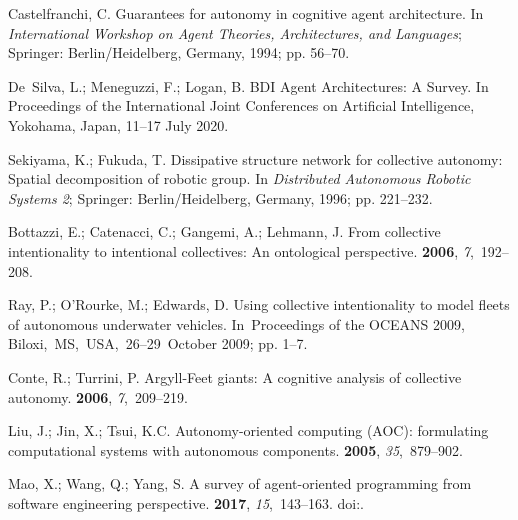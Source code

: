 \documentclass[jsan,article,accept,moreauthors,pdftex]{Definitions/mdpi}
\begin{document}
\begin{thebibliography}{999}
Castelfranchi, C.
\newblock Guarantees for autonomy in cognitive agent architecture.
\newblock   In \emph{International Workshop on Agent Theories, Architectures, and Languages}; Springer: Berlin/Heidelberg, Germany,  1994; pp. 56--70.

De~Silva, L.; Meneguzzi, F.; Logan, B.
\newblock BDI Agent Architectures: A Survey.
\newblock  In Proceedings of the International Joint Conferences on Artificial Intelligence, Yokohama, Japan, 11--17 July 2020.

Sekiyama, K.; Fukuda, T.
\newblock Dissipative structure network for collective autonomy: Spatial
  decomposition of robotic group. In {\em Distributed Autonomous Robotic
  Systems 2}; Springer: Berlin/Heidelberg, Germany, 1996; pp. 221--232.

Bottazzi, E.; Catenacci, C.; Gangemi, A.; Lehmann, J.
\newblock From collective intentionality to intentional collectives: An
  ontological perspective.
 {\bf 2006}, {\em 7},~192--208.

Ray, P.; O'Rourke, M.; Edwards, D.
\newblock Using collective intentionality to model fleets of autonomous
  underwater vehicles.
\newblock  In~Proceedings of the OCEANS 2009, \mbox{Biloxi, MS, USA, 26--29 October} 2009; pp. 1--7.

Conte, R.; Turrini, P.
\newblock Argyll-Feet giants: {A} cognitive analysis of collective autonomy.
 {\bf 2006}, {\em 7},~209--219.

Liu, J.; Jin, X.; Tsui, K.C.
\newblock Autonomy-oriented computing {(AOC):} formulating computational
  systems with autonomous components.
 {\bf 2005}, {\em
  35},~879--902.

Mao, X.; Wang, Q.; Yang, S.
\newblock A survey of agent-oriented programming from software engineering
  perspective.
 {\bf 2017}, {\em 15},~143--163.
\newblock
  doi:{\href{https://doi.org/10.3233/WEB-170357}{}}.


\end{thebibliography}
\end{document}
